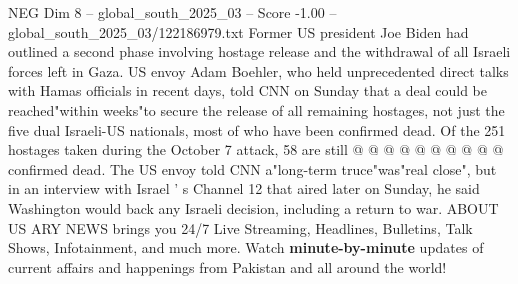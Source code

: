 \begin{textsample}{NEG Dim 8 – global\_south\_2025\_03 – Score -1.00 – global\_south\_2025\_03/122186979.txt}
Former US president Joe Biden had outlined a second phase involving hostage release and the withdrawal of all Israeli forces left in Gaza.
US envoy Adam Boehler, who held unprecedented direct talks with Hamas officials in recent days, told CNN on Sunday that a deal could be reached"within weeks"to secure the release of all remaining hostages, not just the five dual Israeli-US nationals, most of who have been confirmed dead.
Of the 251 hostages taken during the October 7 attack, 58 are still @ @ @ @ @ @ @ @ @ @ confirmed dead.
The US envoy told CNN a"long-term truce"was"real close", but in an interview with Israel ' s Channel 12 that aired later on Sunday, he said Washington would back any Israeli decision, including a return to war.
ABOUT US ARY NEWS brings you 24/7 Live Streaming, Headlines, Bulletins, Talk Shows, Infotainment, and much more.
Watch \textbf{minute-by-minute} updates of current affairs and happenings from Pakistan and all around the world!

\end{textsample}
